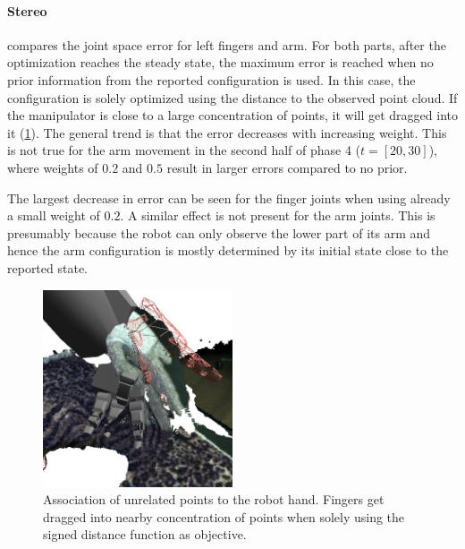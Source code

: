 \paragraph{Stereo}

 compares the joint space error for left fingers and arm. For both parts, after the optimization reaches the steady state, the maximum error is reached when no prior information from the reported configuration is used. In this case, the configuration is solely optimized using the distance to the observed point cloud. If the manipulator is close to a large concentration of points, it will get dragged into it (\cref{fig:no_prior_fingers_table}).
The general trend is that the error decreases with increasing weight. This is not true for the arm movement in the second half of phase 4 ($t=[20,30]$), where weights of $0.2$ and $0.5$ result in larger errors compared to no prior.

The largest decrease in error can be seen for the finger joints when using already a small weight of $0.2$. A similar effect is not present for the arm joints. This is presumably because the robot can only observe the lower part of its arm and hence the arm configuration is mostly determined by its initial state close to the reported state.

\begin{figure}
\centering
\includegraphics[width=0.5\textwidth]{images/eval_prior/fingers_in_table.png}
\caption[Wrong association of data points]{Association of unrelated points to the robot hand. Fingers get dragged into nearby concentration of points when solely using the signed distance function as objective.}
\label{fig:no_prior_fingers_table}
\end{figure}


